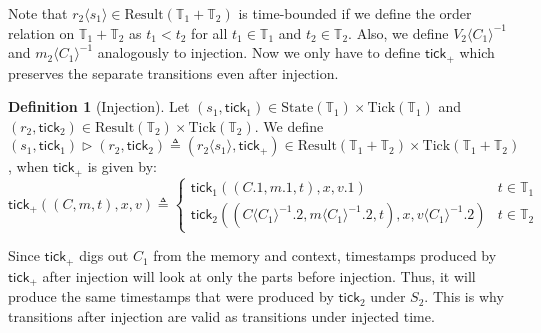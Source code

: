 \documentclass[acmsmall,review]{acmart}\settopmatter{printfolios=true,printccs=false,printacmref=false}
\theoremstyle{definition}
\newtheorem{definition}{Definition}[section]
\newcommand*{\Time}{\mathbb{T}}
\newcommand*{\mem}{m}
\newcommand*{\State}{\text{State}}
\newcommand*{\Result}{\text{Result}}
\newcommand*{\Tick}{\text{Tick}}
\newcommand*{\tick}{\mathsf{tick}}
\newcommand*{\inject}[2]{{#2}\langle{#1}\rangle}
\newcommand*{\delete}[2]{{#2}{\langle{#1}\rangle}^{-1}}
\begin{document}
Note that $\inject{s_1}{r_2}\in\Result(\Time_1+\Time_2)$ is time-bounded if we define the order relation on $\Time_1+\Time_2$ as $t_1<t_2$ for all $t_1\in\Time_1$ and $t_2\in\Time_2$.
Also, we define $\delete{C_1}{V_2}$ and $\delete{C_1}{\mem_2}$ analogously to injection.
Now we only have to define $\tick_+$ which preserves the separate transitions even after injection.

\begin{definition}[Injection]
  Let $(s_1,\tick_1)\in\State(\Time_1)\times\Tick(\Time_1)$ and $(r_2,\tick_2)\in\Result(\Time_2)\times\Tick(\Time_2)$.
  We define $(s_1,\tick_1)\rhd(r_2,\tick_2)\triangleq(\inject{s_1}{r_2},\tick_+)\in\Result(\Time_1+\Time_2)\times\Tick(\Time_1+\Time_2)$, when $\tick_+$ is given by:
  \[
    \tick_+((C,\mem,t),x,v)\triangleq
    \begin{cases}
      \tick_1((C.1,\mem.1,t),x,v.1)                                           & t\in\Time_1 \\
      \tick_2((\delete{C_1}{C}.2,\delete{C_1}{\mem}.2,t),x,\delete{C_1}{v}.2) & t\in\Time_2
    \end{cases}
  \]
\end{definition}

Since $\tick_+$ digs out $C_1$ from the memory and context, timestamps produced by $\tick_+$ after injection will look at only the parts before injection.
Thus, it will produce the same timestamps that were produced by $\tick_2$ under $S_2$.
This is why transitions after injection are valid as transitions under injected time.
\end{document}
